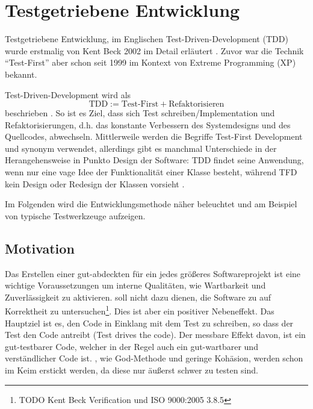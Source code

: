 \section{Testgetriebene Entwicklung}
\label{sec:tdd}
Testgetriebene Entwicklung, im Englischen Test-Driven-Development (TDD) wurde erstmalig von Kent Beck 2002 im Detail erläutert \citep{beck_test_2002}. Zuvor war die Technik "`Test-First"' aber schon seit 1999 im Kontext von Extreme Programming (XP) bekannt.

Test-Driven-Development wird als
$$ \text{TDD} := \text{Test-First} + \text{Refaktorisieren}$$
beschrieben \citep{scott_ambler_introduction_2002}. So ist es Ziel, dass sich Test schreiben/Implementation und Refaktorisierungen, d.h. das konstante Verbessern des Systemdesigns und des Quellcodes, abwechseln. Mittlerweile werden die Begriffe Test-First Development und  synonym verwendet, allerdings gibt es manchmal Unterschiede in der Herangehensweise in Punkto Design der Software: TDD findet seine Anwendung, wenn nur eine vage Idee der Funktionalität einer Klasse besteht, während TFD kein Design oder Redesign der Klassen vorsieht \citep{stackoverflow_testing_2008}.



Im Folgenden wird die Entwicklungsmethode  näher beleuchtet und am Beispiel von  typische Testwerkzeuge aufzeigen. 
\subsection{Motivation}
  Das Erstellen einer gut-abdeckten  für ein jedes größeres Softwareprojekt ist eine wichtige Voraussetzungen um interne Qualitäten, wie Wartbarkeit und Zuverlässigkeit zu aktivieren.  soll nicht dazu dienen, die Software zu auf Korrektheit zu untersuchen\footnote{TODO Kent Beck Verification und ISO 9000:2005 3.8.5}. Dies ist aber ein positiver Nebeneffekt. Das Hauptziel ist es, den Code in Einklang mit dem Test zu schreiben, so dass der Test den Code antreibt (Test drives the code). Der messbare Effekt davon, ist ein gut-testbarer Code, welcher in der Regel auch ein gut-wartbarer und verständlicher Code ist. , wie God-Methode und geringe Kohäsion, werden schon im Keim erstickt werden, da diese nur äußerst schwer zu testen sind.

